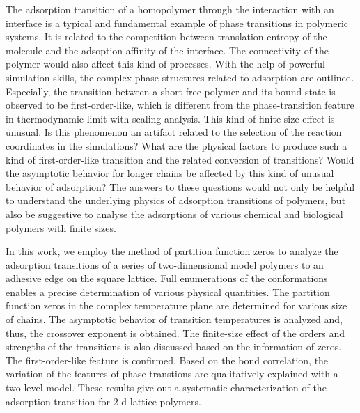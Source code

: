 \documentclass[aps,pre,twocolumn,showpacs,preprintnumbers,amsmath,amssymb]{revtex4-1}
\begin{document}
The adsorption transition of a homopolymer through the interaction with
an interface is a typical and fundamental example of phase transitions
in polymeric systems\cite{LifshitzRMP78,deGennesBook79,ChengBook08,PhysRep,
PCCP10, JCP09,JCP09b,JCP10,PRL95,BinderBook95}. It is related to the
competition between translation entropy of the molecule and the adsoption
affinity of the interface. The connectivity of the polymer would also 
affect this kind of processes. With the help of powerful simulation skills,
the complex phase structures related to adsorption are outlined\cite{PCCP10,
JCP09,JCP09b,JCP10,JCP08,Pull09}. Especially, the transition between a short
free polymer and its bound state is observed
to be first-order-like, which is different from the phase-transition
feature in thermodynamic limit with scaling analysis. This kind of finite-size
effect is unusual. Is this phenomenon an artifact related to the selection
of the reaction coordinates in the simulations? What are the physical factors
to produce such a kind of first-order-like transition and the related
conversion of transitions? Would the asymptotic behavior for longer chains
be affected by this kind of unusual behavior of adsorption? The answers to
these questions would not only be helpful to understand the underlying physics
of adsorption transitions of polymers, but also be suggestive to analyse
the adsorptions of various chemical and biological polymers with finite sizes.

In this work, we employ the method of partition function zeros to analyze the
adsorption transitions of a series of two-dimensional model polymers to an
adhesive edge on the square lattice. Full enumerations of the conformations
enables a precise determination of various physical quantities. The partition
function zeros in the complex temperature plane are determined for various
size of chains. The asymptotic behavior of transition temperatures is analyzed
and, thus, the crossover exponent is obtained. The finite-size effect of the
orders and strengths of the transitions is also discussed based on the
information of zeros. The first-order-like feature is confirmed. Based on
the bond correlation, the variation of the features of phase transtions
are qualitatively explained with a two-level model. These results give out a
systematic characterization of the adsorption transition for 2-d
lattice polymers.

\end{document}
